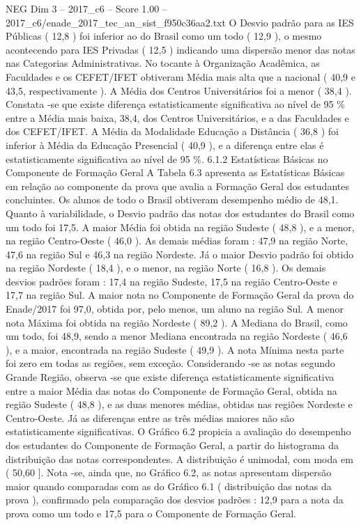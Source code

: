 \begin{textsample}{NEG Dim 3 – 2017\_c6 – Score 1.00 – 2017\_c6/enade\_2017\_tec\_an\_sist\_f950c36aa2.txt}
O Desvio padrão para as IES Públicas ( 12,8 ) foi inferior ao do Brasil como um todo ( 12,9 ), o mesmo acontecendo para IES Privadas ( 12,5 ) indicando uma dispersão menor das notas nas Categorias Administrativas.
No tocante à Organização Acadêmica, as Faculdades e os CEFET/IFET obtiveram Média mais alta que a nacional ( 40,9 e 43,5, respectivamente ).
A Média dos Centros Universitários foi a menor ( 38,4 ).
Constata -se que existe diferença estatisticamente significativa ao nível de 95 \% entre a Média mais baixa, 38,4, dos Centros Universitários, e a das Faculdades e dos CEFET/IFET.
A Média da Modalidade Educação a Distância ( 36,8 ) foi inferior à Média da Educação Presencial ( 40,9 ), e a diferença entre elas é estatisticamente significativa ao nível de 95 \%. 6.1.2 Estatísticas Básicas no Componente de Formação Geral A Tabela 6.3 apresenta as Estatísticas Básicas em relação ao componente da prova que avalia a Formação Geral dos estudantes concluintes.
Os alunos de todo o Brasil obtiveram desempenho médio de 48,1.
Quanto à variabilidade, o Desvio padrão das notas dos estudantes do Brasil como um todo foi 17,5.
A maior Média foi obtida na região Sudeste ( 48,8 ), e a menor, na região Centro-Oeste ( 46,0 ).
As demais médias foram : 47,9 na região Norte, 47,6 na região Sul e 46,3 na região Nordeste.
Já o maior Desvio padrão foi obtido na região Nordeste ( 18,4 ), e o menor, na região Norte ( 16,8 ).
Os demais desvios padrões foram : 17,4 na região Sudeste, 17,5 na região Centro-Oeste e 17,7 na região Sul.
A maior nota no Componente de Formação Geral da prova do Enade/2017 foi 97,0, obtida por, pelo menos, um aluno na região Sul.
A menor nota Máxima foi obtida na região Nordeste ( 89,2 ).
A Mediana do Brasil, como um todo, foi 48,9, sendo a menor Mediana encontrada na região Nordeste ( 46,6 ), e a maior, encontrada na região Sudeste ( 49,9 ).
A nota Mínima nesta parte foi zero em todas as regiões, sem exceção.
Considerando -se as notas segundo Grande Região, observa -se que existe diferença estatisticamente significativa entre a maior Média das notas do Componente de Formação Geral, obtida na região Sudeste ( 48,8 ), e as duas menores médias, obtidas nas regiões Nordeste e Centro-Oeste.
Já as diferenças entre as três médias maiores não são estatisticamente significativas.
O Gráfico 6.2 propicia a avaliação do desempenho dos estudantes do Componente de Formação Geral, a partir do histograma da distribuição das notas correspondentes.
A distribuição é unimodal, com moda em ( 50,60 ].
Nota -se, ainda que, no Gráfico 6.2, as notas apresentam dispersão maior quando comparadas com as do Gráfico 6.1 ( distribuição das notas da prova ), confirmado pela comparação dos desvios padrões : 12,9 para a nota da prova como um todo e 17,5 para o Componente de Formação Geral.

\end{textsample}
